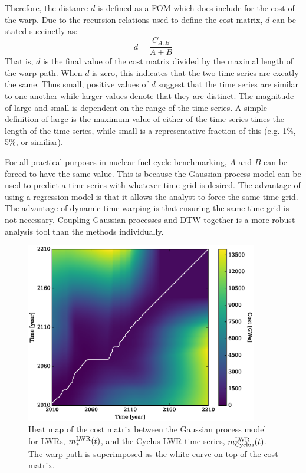 Therefore, the distance $d$ is defined as a FOM which does include for the cost of the
warp.  Due to the recursion relations used to define the cost matrix, $d$ can be 
stated succinctly as:
\begin{equation}
\label{d-calc}
d = \frac{C_{A,B}}{A + B}
\end{equation}
That is, $d$ is the final value of the cost matrix divided by the maximal length 
of the warp path. When $d$ is zero, this indicates that the two time series
are excatly the same. Thus small, positive values of $d$ suggest that the 
time series are similar to one another while larger values denote that they 
are distinct. The magnitude of large and small is dependent on the range of 
the time series. A simple definition of large is the maximum 
value of either of the time series times the length of the time series, 
while small is a representative fraction of this (e.g. 1\%, 5\%, or similiar).

For all practical purposes in nuclear fuel cycle benchmarking, $A$ and $B$ can be 
forced to have the same
value. This is because the Gaussian process model can be used to predict a time series 
with whatever time grid is desired.  The advantage of using a regression model 
is that it allows the analyst to force the same time grid.  The advantage of 
dynamic time warping is that ensuring the same time grid is not necessary.
Coupling Gaussian processes and DTW together is a more robust analysis tool 
than the methods individually.

\begin{figure}[htb]
\centering
\includegraphics[width=0.9\textwidth]{cost-lwr-model-to-lwr-cyclus.eps}
\caption{Heat map of the cost matrix between the Gaussian process model 
for LWRs, $m_*^{\mathrm{LWR}}(t)$, and the Cyclus LWR time series, $m_{\mathrm{Cyclus}}^{\mathrm{LWR}}(t)$.
The warp path is superimposed as the white curve on top of the cost matrix.}
\label{cost-lwr-model-to-lwr-cyclus}
\end{figure}

